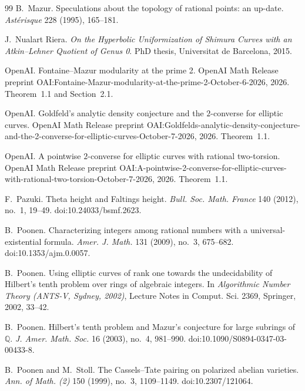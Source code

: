 \documentclass[11pt]{article}
\theoremstyle{definition}
\begin{document}
\begin{thebibliography}{99}
B.~Mazur.
\newblock Speculations about the topology of rational points: an up-date.
\newblock \emph{Ast\'erisque} 228 (1995), 165--181.

J.~Nualart Riera.
\newblock \emph{On the Hyperbolic Uniformization of Shimura Curves with an
  Atkin--Lehner Quotient of Genus 0}.
\newblock PhD thesis, Universitat de Barcelona, 2015.

OpenAI.
\newblock Fontaine--Mazur modularity at the prime 2.
\newblock OpenAI Math Release preprint
  OAI:Fontaine-Mazur-modularity-at-the-prime-2-October-6-2026, 2026.
\newblock Theorem~1.1 and Section~2.1.

OpenAI.
\newblock Goldfeld's analytic density conjecture and the $2$-converse for
  elliptic curves.
\newblock OpenAI Math Release preprint
  OAI:Goldfelds-analytic-density-conjecture-and-the-2-converse-for-elliptic-curves-October-7-2026,
  2026.
\newblock Theorem~1.1.

OpenAI.
\newblock A pointwise $2$-converse for elliptic curves with rational
  two-torsion.
\newblock OpenAI Math Release preprint
  OAI:A-pointwise-2-converse-for-elliptic-curves-with-rational-two-torsion-October-7-2026,
  2026.
\newblock Theorem~1.1.

F.~Pazuki.
\newblock Theta height and Faltings height.
\newblock \emph{Bull. Soc. Math. France} 140 (2012), no.~1, 19--49.
\newblock doi:10.24033/bsmf.2623.

B.~Poonen.
\newblock Characterizing integers among rational numbers with a
  universal-existential formula.
\newblock \emph{Amer. J. Math.} 131 (2009), no.~3, 675--682.
\newblock doi:10.1353/ajm.0.0057.

B.~Poonen.
\newblock Using elliptic curves of rank one towards the undecidability of
  Hilbert's tenth problem over rings of algebraic integers.
\newblock In \emph{Algorithmic Number Theory (ANTS-V, Sydney, 2002)}, Lecture
  Notes in Comput. Sci. 2369, Springer, 2002, 33--42.

B.~Poonen.
\newblock Hilbert's tenth problem and Mazur's conjecture for large subrings
  of $\mathbb Q$.
\newblock \emph{J. Amer. Math. Soc.} 16 (2003), no.~4, 981--990.
\newblock doi:10.1090/S0894-0347-03-00433-8.

B.~Poonen and M.~Stoll.
\newblock The Cassels--Tate pairing on polarized abelian varieties.
\newblock \emph{Ann. of Math. (2)} 150 (1999), no.~3, 1109--1149.
\newblock doi:10.2307/121064.


\end{thebibliography}
\end{document}

